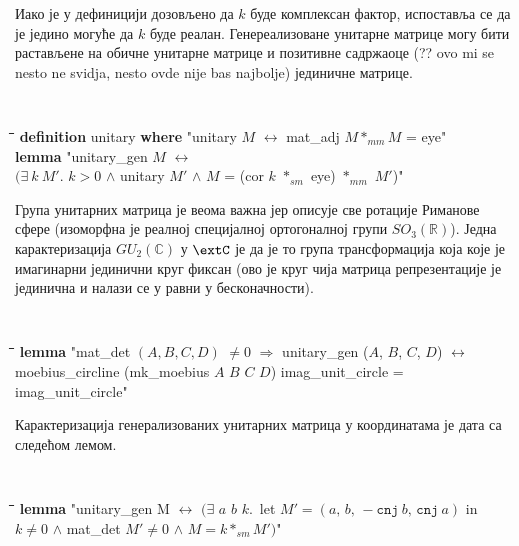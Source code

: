\noindent Иако је у дефиницији дозовљено да $k$ буде комплексан
фактор, испоставља се да је једино могуће да $k$ буде
реалан. Генереализоване унитарне матрице могу бити растављене на
обичне унитарне матрице и позитивне садржаоце (?? ovo mi se nesto ne
svidja, nesto ovde nije bas najbolje) јединичне матрице.

{\tt
  \begin{tabbing}
    \hspace{5mm}\=\hspace{5mm}\=\hspace{5mm}\=\hspace{5mm}\=\hspace{5mm}\=\kill
{\bf definition} unitary {\bf where} "unitary $M$ $\longleftrightarrow$ mat\_adj $M *_{mm} M$ = eye"\\
{\bf lemma} "unitary\_gen $M$ $\longleftrightarrow$ \\
\> $($$\exists\ k\ M'$. $k > 0$ $\wedge$ unitary $M'$ $\wedge$ $M$ = (cor $k$ $*_{sm}$ eye) $*_{mm}$ $M'$)"
  \end{tabbing}
}

Група унитарних матрица је веома важна јер описује све ротације
Риманове сфере (изоморфна је реалној специјалној ортогоналној групи
$SO_3(\mathbb{R})$). Једна карактеризација $GU_2(\mathbb{C})$ у
$\extC$ је да је то група трансформација која које је имагинарни
јединични круг фиксан (ово је круг чија матрица репрезентације је
јединична и налази се у равни у бесконачности).

{\tt
  \begin{tabbing}
    \hspace{5mm}\=\hspace{5mm}\=\hspace{5mm}\=\hspace{5mm}\=\hspace{5mm}\=\kill
{\bf lemma} "mat\_det $(A, B, C, D)$ $\neq 0$ $\Longrightarrow$ unitary\_gen ($A$, $B$, $C$, $D$)  $\longleftrightarrow$\\
\>moebius\_circline (mk\_moebius $A$ $B$ $C$ $D$) imag\_unit\_circle = \\
\>imag\_unit\_circle"
  \end{tabbing}
}


Карактеризација генерализованих унитарних матрица у координатама је
дата са следећом лемом. {\tt
  \begin{tabbing}
    \hspace{5mm}\=\hspace{5mm}\=\hspace{5mm}\=\hspace{5mm}\=\hspace{5mm}\=\kill
{\bf lemma} "unitary\_gen M $\longleftrightarrow$ $($$\exists$ $a$ $b$ $k$.\ let $M' = (a,\,b,\,-\mathtt{cnj}\ b,\,\mathtt{cnj}\ a)$ in \\
\>$k \neq 0$ $\wedge$ mat\_det $M' \neq 0$ $\wedge$ $M = k *_{sm} M'$$)$"
  \end{tabbing}
}

